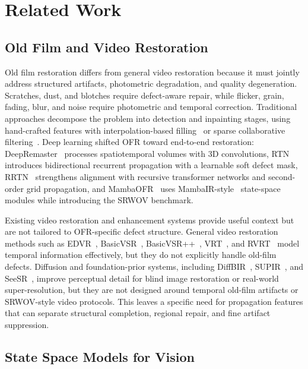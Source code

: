 \section{Related Work}
\label{sec:related}

\subsection{Old Film and Video Restoration}
\label{subsec:ofr}

Old film restoration differs from general video restoration because it must jointly address structured artifacts, photometric degradation, and quality degeneration. Scratches, dust, and blotches require defect-aware repair, while flicker, grain, fading, blur, and noise require photometric and temporal correction. Traditional approaches decompose the problem into detection and inpainting stages, using hand-crafted features with interpolation-based filling~\cite{kokaram2004missing} or sparse collaborative filtering~\cite{dabov2007bm3d,he2013guided}. Deep learning shifted OFR toward end-to-end restoration: DeepRemaster~\cite{iizuka2019deepremaster} processes spatiotemporal volumes with 3D convolutions, RTN~\cite{wan2022rtn} introduces bidirectional recurrent propagation with a learnable soft defect mask, RRTN~\cite{lin2024rrtn} strengthens alignment with recursive transformer networks and second-order grid propagation, and MambaOFR~\cite{mao2025mambaofr} uses MambaIR-style~\cite{guo2024mambair} state-space modules while introducing the SRWOV benchmark.

Existing video restoration and enhancement systems provide useful context but are not tailored to OFR-specific defect structure. General video restoration methods such as EDVR~\cite{wang2019edvr}, BasicVSR~\cite{chan2021basicvsr}, BasicVSR++~\cite{chan2022basicvsrpp}, VRT~\cite{liang2024vrt}, and RVRT~\cite{liang2022rvrt} model temporal information effectively, but they do not explicitly handle old-film defects. Diffusion and foundation-prior systems, including DiffBIR~\cite{lin2024diffbir}, SUPIR~\cite{yu2024supir}, and SeeSR~\cite{wu2024seesr}, improve perceptual detail for blind image restoration or real-world super-resolution, but they are not designed around temporal old-film artifacts or SRWOV-style video protocols. This leaves a specific need for propagation features that can separate structural completion, regional repair, and fine artifact suppression.

\subsection{State Space Models for Vision}
\label{subsec:ssm}

